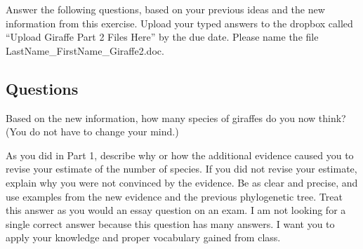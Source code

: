 \documentclass[11pt, addpoints]{exam}
\begin{document}
\newpage

Answer the following questions, based on your previous ideas and
the new information from this exercise. Upload your typed answers to the dropbox called ``Upload Giraffe Part 2
Files Here'' by the due date.  Please name the file LastName\_FirstName\_Giraffe2.doc.

\subsection*{Questions}

\begin{questions}

\question[1]
Based on the new information, how many species of giraffes do you now
think? (You do not have to change your mind.)

\question[10]
As you did in Part 1, describe why or how the additional evidence caused you to
revise your estimate of the number of species. If you did not revise
your estimate, explain why you were not convinced by the evidence. Be as
clear and precise, and use examples from the new evidence and the previous phylogenetic tree.
Treat this answer as you would an essay question on an exam. I am not
looking for a single correct answer because this question has many answers. I
want you to apply your knowledge and proper vocabulary gained from
class. 

\end{questions}
\end{document}
